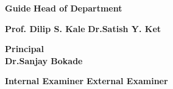 \textbf {Guide}\vspace{0.20cm}
\hspace{3.7in} \textbf{Head of Department}\\ \hspace*{0cm}

\textbf {Prof. Dilip S. Kale} \hspace{3 in} \textbf{Dr.Satish Y. Ket} \\
\vspace{0.40cm}
 

\begin{center}
\textbf{Principal}\\
\vspace{0.20cm}
\textbf{Dr.Sanjay Bokade}\\
\end{center}
\vspace{0.25cm}
\textbf {Internal Examiner}
\hspace{3.3in} \textbf{External Examiner}\\ 

